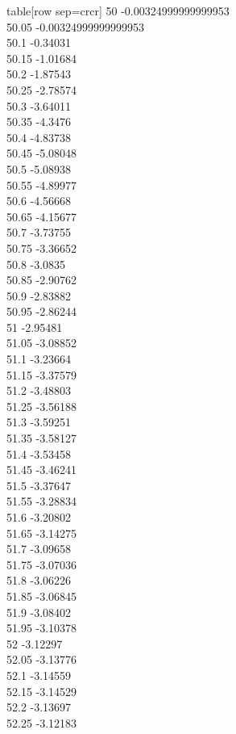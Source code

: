   table[row sep=crcr]{%
50	-0.00324999999999953\\
50.05	-0.00324999999999953\\
50.1	-0.34031\\
50.15	-1.01684\\
50.2	-1.87543\\
50.25	-2.78574\\
50.3	-3.64011\\
50.35	-4.3476\\
50.4	-4.83738\\
50.45	-5.08048\\
50.5	-5.08938\\
50.55	-4.89977\\
50.6	-4.56668\\
50.65	-4.15677\\
50.7	-3.73755\\
50.75	-3.36652\\
50.8	-3.0835\\
50.85	-2.90762\\
50.9	-2.83882\\
50.95	-2.86244\\
51	-2.95481\\
51.05	-3.08852\\
51.1	-3.23664\\
51.15	-3.37579\\
51.2	-3.48803\\
51.25	-3.56188\\
51.3	-3.59251\\
51.35	-3.58127\\
51.4	-3.53458\\
51.45	-3.46241\\
51.5	-3.37647\\
51.55	-3.28834\\
51.6	-3.20802\\
51.65	-3.14275\\
51.7	-3.09658\\
51.75	-3.07036\\
51.8	-3.06226\\
51.85	-3.06845\\
51.9	-3.08402\\
51.95	-3.10378\\
52	-3.12297\\
52.05	-3.13776\\
52.1	-3.14559\\
52.15	-3.14529\\
52.2	-3.13697\\
52.25	-3.12183\\
}
